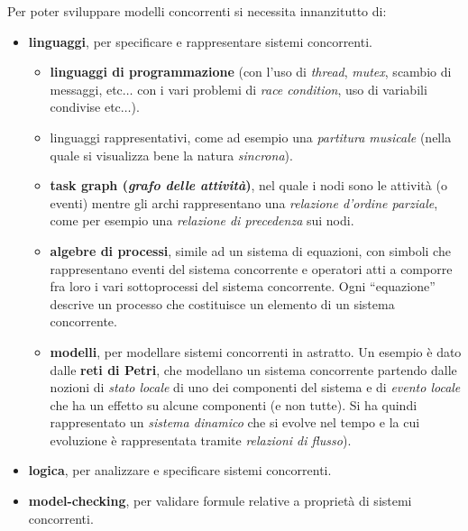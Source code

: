 \documentclass[a4paper,12pt, oneside]{book}
\begin{document}
Per poter sviluppare modelli concorrenti si necessita innanzitutto di:
\begin{itemize}
  \item \textbf{linguaggi}, per specificare e rappresentare sistemi concorrenti. 
  \begin{itemize}
    \item \textbf{linguaggi di programmazione} (con l'uso di \textit{thread},
    \textit{mutex}, scambio di messaggi, etc$\ldots$ con i vari
    problemi di \textit{race condition}, uso di variabili condivise
    etc$\ldots$).
    
    \item linguaggi rappresentativi, come ad esempio  
    una \textit{partitura musicale} (nella quale si visualizza bene la natura
    \textit{sincrona}).

    \item \textbf{task graph (\textit{grafo delle
        attività})}, nel quale i nodi sono le attività (o eventi) mentre gli archi
    rappresentano una \textit{relazione d'ordine parziale}, come per esempio una
    \textit{relazione di precedenza} sui nodi.

    \item \textbf{algebre di processi}, simile ad un sistema di equazioni, con simboli
    che rappresentano eventi del sistema concorrente e operatori atti a comporre
    fra loro i vari sottoprocessi del sistema concorrente. Ogni ``equazione''
    descrive un processo che costituisce un elemento di un sistema concorrente.
    
    \item \textbf{modelli}, per modellare sistemi concorrenti in astratto. Un
    esempio è dato dalle \textbf{reti di Petri}, che modellano un sistema
    concorrente partendo dalle nozioni di \textit{stato locale} di uno dei
    componenti del sistema e di \textit{evento locale} che ha un effetto su alcune
    componenti (e non tutte). Si ha quindi rappresentato un \textit{sistema
      dinamico} che si evolve nel tempo e la cui evoluzione è rappresentata tramite
    \textit{relazioni di flusso}).

  \end{itemize}
  
  \item \textbf{logica}, per analizzare e specificare sistemi concorrenti.
  \item \textbf{model-checking}, per validare formule relative a proprietà di
  sistemi concorrenti.
\end{itemize}
\end{document}
